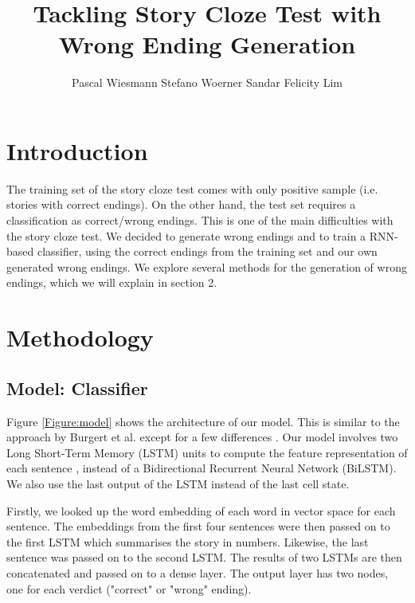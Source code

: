 \documentclass{article}
\title{Tackling Story Cloze Test with Wrong Ending Generation}
\author{Pascal Wiesmann \qquad Stefano Woerner \qquad Sandar Felicity Lim}
\begin{document}

\maketitle


\section{Introduction}

The training set of the story cloze test comes with only positive sample (i.e. stories with correct endings). On the other hand, the test set requires a classification as correct/wrong endings. This is one of the main difficulties with the story cloze test. We decided to generate wrong endings and to train a RNN-based classifier, using the correct endings from the training set and our own generated wrong endings. We explore several methods for the generation of wrong endings, which we will explain in section 2.

\section{Methodology}

\subsection{Model: Classifier}

Figure \ref{Figure:model} shows the architecture of our model. This is similar to the approach by Burgert et al. except for a few differences \cite{top4}. Our model involves two Long Short-Term Memory (LSTM) units to compute the feature representation of each sentence \citep{lstm}, instead of a Bidirectional Recurrent Neural Network (BiLSTM). We also use the last output of the LSTM instead of the last cell state.

Firstly, we looked up the word embedding of each word in vector space for each sentence. The embeddings from the first four sentences were then passed on to the first LSTM which summarises the story in numbers. Likewise, the last sentence was passed on to the second LSTM. The results of two LSTMs are then concatenated and passed on to a dense layer. The output layer has two nodes, one for each verdict ("correct" or "wrong" ending).
\end{document}
